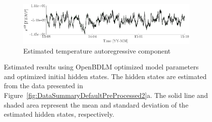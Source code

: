 \begin{figure}[h!]
\begin{subfigure}{\linewidth}
\end{subfigure}
\begin{subfigure}{\linewidth}\centering
\includegraphics[width=0.9\linewidth]{./docfigs/Example_DISPTEMPSIM/optim_param_optim_initialhiddenstate/TEMP_AR_6.pdf} 
\caption{Estimated temperature autoregressive component}
\end{subfigure}
\caption{Estimated results using OpenBDLM optimized model parameters and optimized initial hidden states. The hidden states are estimated from the data presented in Figure~\ref{fig:DataSummaryDefaultPreProcessed2}a. The solid line and shaded area represent the mean and standard deviation of the estimated hidden states, respectively.}
\label{fig:DISPTEMPSIMOptimizedOptimizedExample2}
\end{figure}
